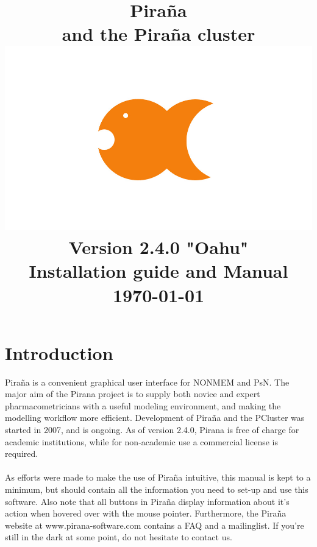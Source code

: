 \documentclass[a4,11pt]{report} \usepackage[pdftex]{graphicx}
\begin{document}
\title{\textbf{\textcolor{PiranaOrange}{Pira\~na}\scriptsize\\ and the
Pira\~na cluster}\\ \vspace{15pt}
\includegraphics[scale=0.12]{images/pirana_logo.jpg} \\ \vspace{15pt}
\scriptsize Version 2.4.0 "Oahu"\\Installation guide and Manual \\
\vspace{5pt} \scriptsize {\today} \\
\date{}}
\maketitle

\tableofcontents

\chapter{Introduction} \textcolor{PiranaOrange}{Pira\~na} is a
convenient graphical user interface for NONMEM and PsN. The major aim
of the Pirana project is to supply both novice and expert
pharmacometricians with a useful modeling environment, and making the
modelling workflow more efficient. Development of Pira\~na and the
PCluster was started in 2007, and is ongoing. As of version 2.4.0,
Pirana is free of charge for academic institutions, while for non-academic
use a commercial license is required. \\
\vspace{1pt}\\ As efforts were made to make the use of Pira\~na
intuitive, this manual is kept to a minimum, but should contain all
the information you need to set-up and use this software. Also note
that all buttons in Pira\~na display information about it's action
when hovered over with the mouse pointer. Furthermore, the Pira\~na
website at www.pirana-software.com contains a FAQ and a mailinglist. If you're
still in the dark at some point, do not hesitate to contact us.
\end{document}
